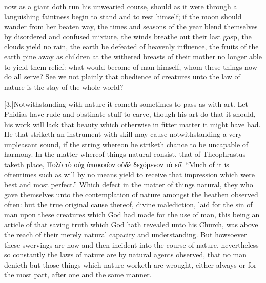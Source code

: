 now as a giant doth run his unwearied course, should as it were through a languishing faintness begin to stand and to rest himself; if the moon should wander from her beaten way, the times and seasons of the year blend themselves by disordered and confused mixture, the winds breathe out their last gasp, the clouds yield no rain, the earth be defeated of heavenly influence, the fruits of the earth pine away as children at the withered breasts of their mother no longer  able to yield them relief: what would become of man himself, whom these things now do all serve? See we not plainly that obedience of creatures unto the law of nature is the stay of the whole world?

[3.]Notwithstanding with nature it cometh sometimes to pass as with art. Let Phidias have rude and obstinate stuff to carve, though his art do that it should, his work will lack that beauty which otherwise in fitter matter it might have had. He that striketh an instrument with skill may cause notwithstanding a very unpleasant sound, if the string whereon he striketh chance to be uncapable of harmony. In the matter whereof things natural consist, that of Theophrastus taketh place, Πολὺ τὸ οὐχ ὑπακου̑ον οὐδὲ δεχόμενον τὸ εὐ̑. “Much of it is oftentimes such as will by no means yield to receive that impression which were best and most perfect.” Which defect in the matter of things natural, they who gave themselves unto the contemplation of nature amongst the heathen observed often: but the true original cause thereof, divine malediction, laid for the sin of man upon these creatures which God had made for the use of man, this being an article of that saving truth which God hath revealed unto his Church, was above the reach of their merely natural  capacity and understanding. But howsoever these swervings are now and then incident into the course of nature, nevertheless so constantly the laws of nature are by natural agents observed, that no man denieth but those things which nature worketh are wrought, either always or for the most part, after one and the same manner.

